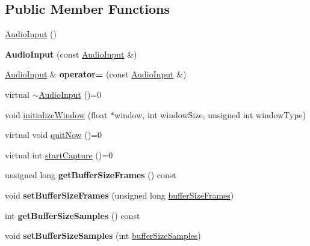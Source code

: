 \subsection*{Public Member Functions}
\begin{DoxyCompactItemize}
\item 
\mbox{\hyperlink{classAudioInput_a51903411fbfb29b77f30a0ee3fbaa50e}{Audio\+Input}} ()
\item 
\mbox{\label{classAudioInput_a8a86507eb41c9db581def690f1f96669}} 
{\bfseries Audio\+Input} (const \mbox{\hyperlink{classAudioInput}{Audio\+Input}} \&)
\item 
\mbox{\label{classAudioInput_a104f135fc060ebd133166516650304e0}} 
\mbox{\hyperlink{classAudioInput}{Audio\+Input}} \& {\bfseries operator=} (const \mbox{\hyperlink{classAudioInput}{Audio\+Input}} \&)
\item 
virtual \mbox{\hyperlink{classAudioInput_aaf278510da0fee4ccfd44c679067d96c}{$\sim$\+Audio\+Input}} ()=0
\item 
void \mbox{\hyperlink{classAudioInput_abe6c5796db5f1f0d4944a3c9e8b3962e}{initialize\+Window}} (float $\ast$window, int window\+Size, unsigned int window\+Type)
\item 
virtual void \mbox{\hyperlink{classAudioInput_a4fce5476455b1df813f1cb6eebb08311}{quit\+Now}} ()=0
\item 
virtual int \mbox{\hyperlink{classAudioInput_afa753742035f7069f5ef0c2ece6a62fe}{start\+Capture}} ()=0
\item 
\mbox{\label{classAudioInput_ae877bcc482868235b38fc7bb099d7a43}} 
unsigned long {\bfseries get\+Buffer\+Size\+Frames} () const
\item 
\mbox{\label{classAudioInput_a30068a991c436282680a320c043d021f}} 
void {\bfseries set\+Buffer\+Size\+Frames} (unsigned long \mbox{\hyperlink{classAudioInput_adb734d274b7ce2967b74e2280ff6d487}{buffer\+Size\+Frames}})
\item 
\mbox{\label{classAudioInput_a9a6e1385e3bc495fca357ab684301daa}} 
int {\bfseries get\+Buffer\+Size\+Samples} () const
\item 
\mbox{\label{classAudioInput_a23e782296cc43ff127d9f95f77902b94}} 
void {\bfseries set\+Buffer\+Size\+Samples} (int \mbox{\hyperlink{classAudioInput_a4e213a9a22a62dccc3a54369101559c7}{buffer\+Size\+Samples}})

\end{DoxyCompactItemize}
